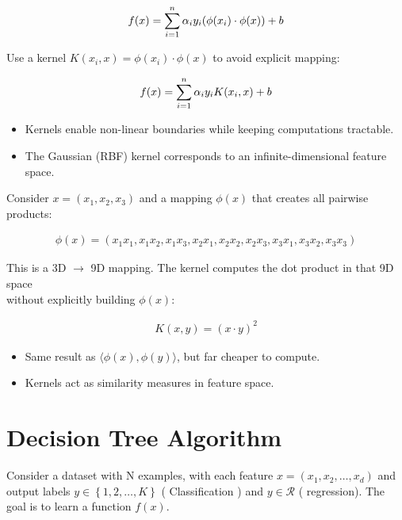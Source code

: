 \documentclass[10pt,a4paper]{article}
\newcommand{\Set}[1]{\left\{#1\right\}}
\begin{document}
		\begin{align*}
			\Large f(x)=\sum_{i=1}^n \alpha_i y_i (\phi(x_i) \cdot \phi(x)) + b
		\end{align*}
	
		Use a kernel $K(x_i, x)=\phi(x_i)\cdot\phi(x)$ to avoid explicit mapping:
	
		\begin{align*}
			\Large f(x)=\sum_{i=1}^n \alpha_i y_i K(x_i, x) + b
		\end{align*}
	
		\begin{itemize}
			\item Kernels enable non-linear boundaries while keeping computations tractable.
			\item The Gaussian (RBF) kernel corresponds to an infinite-dimensional feature space.
		\end{itemize}
	
		Consider $x=(x_1,x_2,x_3)$ and a mapping $\phi(x)$ that creates all pairwise products:
	
		\begin{align*}
			\phi(x) = (x_1x_1, x_1x_2, x_1x_3, x_2x_1, x_2x_2, x_2x_3, x_3x_1, x_3x_2, x_3x_3)
		\end{align*}
	
		This is a 3D $\rightarrow$ 9D mapping. The kernel computes the dot product in that 9D space \\
		without explicitly building $\phi(x)$:
	
		\begin{align*}
			K(x,y) = (x \cdot y)^2
		\end{align*}
	
		\begin{itemize}
			\item Same result as $\langle \phi(x), \phi(y) \rangle$, but far cheaper to compute.
			\item Kernels act as similarity measures in feature space.
		\end{itemize}
	
	
	\section{Decision Tree Algorithm}
	
		Consider a dataset with N examples, with each feature $x = (x_1,x_2, …, x_d)$ and output labels $y \in \Set{1,2,…,K}$ ( Classification ) and $y \in \mathcal{R}$  ( regression). The goal is to learn a function $f(x)$.
	
\end{document}
